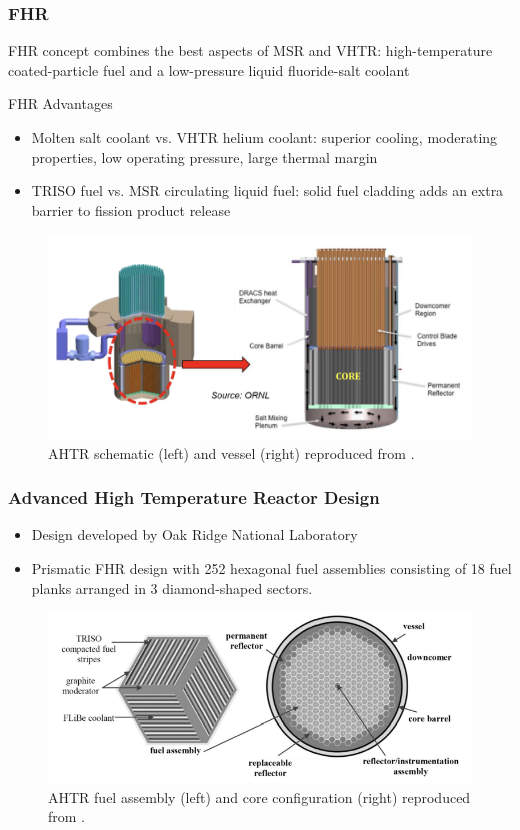 \begin{frame}
  \frametitle{\acrlong{FHR}}
  FHR concept combines the best aspects of MSR and VHTR:
  high-temperature coated-particle fuel and a low-pressure liquid fluoride-salt coolant 
  \begin{block}{\acrfull{FHR} Advantages}
    \begin{itemize}
      \item Molten salt coolant vs. VHTR helium coolant: superior cooling, 
      moderating properties, low operating pressure, large thermal margin
      \item TRISO fuel vs. MSR circulating liquid fuel: solid fuel cladding 
      adds an extra barrier to fission product release
    \end{itemize}
  \end{block}
  \begin{figure}[]
    \centering
    \includegraphics[width=0.5\linewidth]{../docs/figures/reactor-schematic.png} 
    \caption{\acrfull{AHTR} schematic (left) and vessel (right) reproduced from
    \cite{noauthor_fluoride_nodate}.}
\end{figure}
\end{frame}
\begin{frame}
  \frametitle{Advanced High Temperature Reactor Design}
    \begin{itemize}
      \item Design developed by Oak Ridge National Laboratory
      \item Prismatic FHR design with 252 hexagonal fuel assemblies consisting of 
      18 fuel planks arranged in 3 diamond-shaped sectors. 
    \end{itemize}
  \begin{figure}[]
    \centering
    \includegraphics[width=0.9\linewidth]{../docs/figures/ahtr.png} 
    \caption{\acrlong{AHTR} fuel assembly (left) and core configuration (right) 
    reproduced from \cite{ramey_monte_2018}.}
    \label{fig:ahtr}
\end{figure}
\end{frame}

